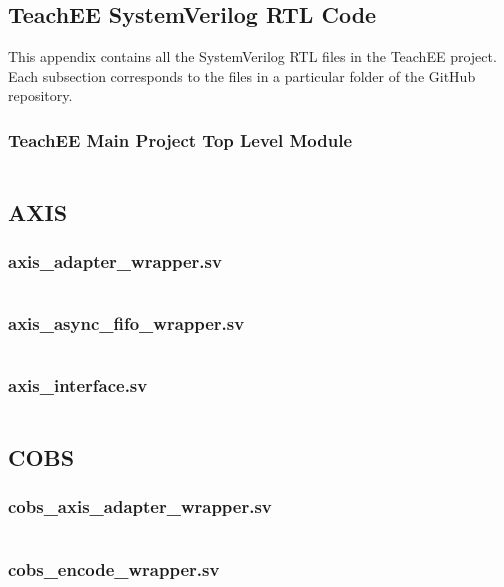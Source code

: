 \documentclass[letterpaper,11pt]{article}
\begin{document}
\begin{appendices}
    \section{TeachEE SystemVerilog RTL Code} \label{appendix:rtl-code}
    This appendix contains all the SystemVerilog RTL files in the TeachEE
    project. Each subsection corresponds to the files in a particular folder of
    the GitHub repository.

    \subsubsection*{TeachEE Main Project Top Level Module}
    \inputminted[linenos,breaklines]{systemverilog}{../../rtl/teachee/teachee.sv}

    \subsection{AXIS} \label{appendix:axis}
    \subsubsection*{axis\_adapter\_wrapper.sv}
    \inputminted[linenos,breaklines]{systemverilog}{../../rtl/axis/axis_adapter_wrapper.sv}
    \subsubsection*{axis\_async\_fifo\_wrapper.sv}
    \inputminted[linenos,breaklines]{systemverilog}{../../rtl/axis/axis_async_fifo_wrapper.sv}
    \subsubsection*{axis\_interface.sv} \label{appendix:axis-interface}
    \inputminted[linenos,breaklines]{systemverilog}{../../rtl/axis/axis_interface.sv}

    \subsection{COBS}
    \subsubsection*{cobs\_axis\_adapter\_wrapper.sv}
    \inputminted[linenos,breaklines]{systemverilog}{../../rtl/cobs/cobs_axis_adapter_wrapper.sv}
    \subsubsection*{cobs\_encode\_wrapper.sv}
    \inputminted[linenos,breaklines]{systemverilog}{../../rtl/cobs/cobs_encode_wrapper.sv}


\end{appendices}
\end{document}
